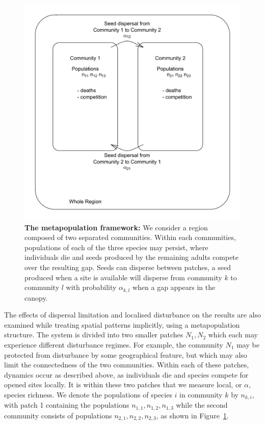 \begin{figure}[htbp]
\begin{center}
\includegraphics[width=4.5in]{schematic.pdf}
\caption[The metapopulation framework]{\textbf{The metapopulation framework:} We consider a region composed of two separated communities. Within each communities, populations of each of the three species may persist, where individuals die and seeds produced by the remaining adults compete over the resulting gap. Seeds can disperse between patches, a seed produced when a site is available will disperse from community $k$ to community $l$ with probability $\alpha_{k,l}$ when a gap appears in the canopy.}
\label{fig:schematic}
\end{center}
\end{figure}

The effects of dispersal limitation and localised disturbance on the results are also examined while treating spatial patterns implicitly, using a metapopulation structure. The system is divided into two smaller patches $N_1,N_2$ which each may experience different disturbance regimes. For example, the community $N_1$ may be protected from disturbance by some geographical feature, but which may also limit the connectedness of the two communities. Within each of these patches, dynamics occur as described above, as individuals die and species compete for opened sites locally. It is within these two patches that we measure local, or $\alpha$, species richness. We denote the populations of species $i$ in community $k$ by $n_{k,i}$, with patch 1 containing the populations $n_{1,1}, n_{1,2}, n_{1,3}$ while the second community consists of populations $n_{2,1}, n_{2,2}, n_{2,3}$, as shown in Figure~\ref{fig:schematic}.

